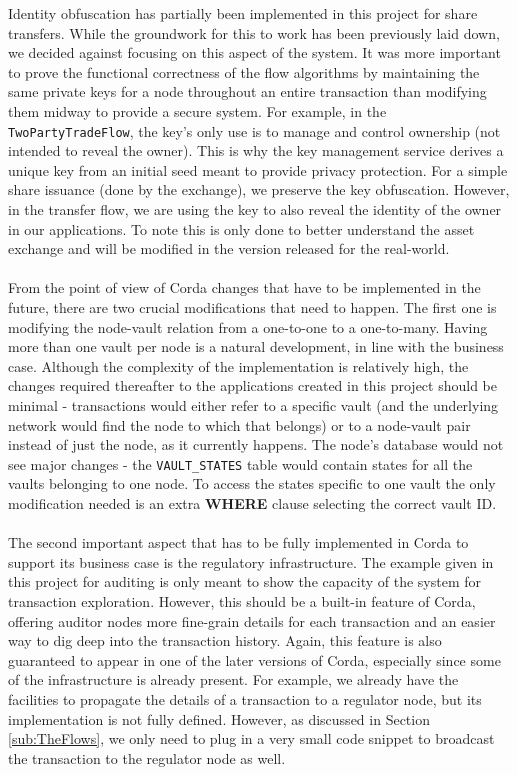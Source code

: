 \documentclass[12pt,twoside]{article}
\begin{document}
Identity obfuscation has partially been implemented in this project for share transfers. While the groundwork for this to work has been previously laid down, we decided against focusing on this aspect of the system. It was more important to prove the functional correctness of the flow algorithms by maintaining the same private keys for a node throughout an entire transaction than modifying them midway to provide a secure system. For example, in the \verb|TwoPartyTradeFlow|, the key's only use is to manage and control ownership (not intended to reveal the owner). This is why the key management service derives a unique key from an initial seed meant to provide privacy protection. For a simple share issuance (done by the exchange), we preserve the key obfuscation. However, in the transfer flow, we are using the key to also reveal the identity of the owner in our applications. To note this is only done to better understand the asset exchange and will be modified in the version released for the real-world.
\\ \\
From the point of view of Corda changes that have to be implemented in the future, there are two crucial modifications that need to happen. The first one is modifying the node-vault relation from a one-to-one to a one-to-many. Having more than one vault per node is a natural development, in line with the business case. Although the complexity of the implementation is relatively high, the changes required thereafter to the applications created in this project should be minimal - transactions would either refer to a specific vault (and the underlying network would find the node to which that belongs) or to a node-vault pair instead of just the node, as it currently happens. The node's database would not see major changes - the \verb|VAULT_STATES| table would contain states for all the vaults belonging to one node. To access the states specific to one vault the only modification needed is an extra \textbf{WHERE} clause selecting the correct vault ID.
\\ \\
The second important aspect that has to be fully implemented in Corda to support its business case is the regulatory infrastructure. The example given in this project for auditing is only meant to show the capacity of the system for transaction exploration. However, this should be a built-in feature of Corda, offering auditor nodes more fine-grain details for each transaction and an easier way to dig deep into the transaction history. Again, this feature is also guaranteed to appear in one of the later versions of Corda, especially since some of the infrastructure is already present. For example, we already have the facilities to propagate the details of a transaction to a regulator node, but its implementation is not fully defined. However, as discussed in Section \ref{sub:TheFlows}, we only need to plug in a very small code snippet to broadcast the transaction to the regulator node as well.
\end{document}

